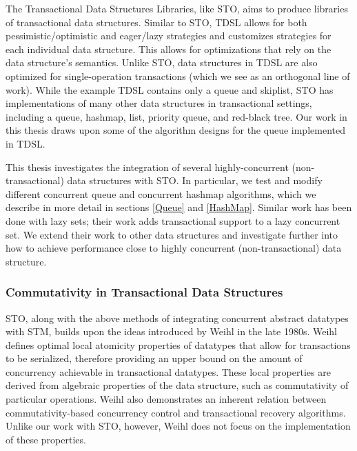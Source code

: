 The Transactional Data Structures Libraries\cite{tdsl}, like STO, aims to produce libraries of transactional data structures. Similar to STO, TDSL allows for both pessimistic/optimistic and eager/lazy strategies and customizes strategies for each individual data structure. This allows for optimizations that rely on the data structure's semantics. Unlike STO, data structures in TDSL are also optimized for single-operation transactions (which we see as an orthogonal line of work). While the example TDSL contains only a queue and skiplist, STO has implementations of many other data structures in transactional settings, including a queue, hashmap, list, priority queue, and red-black tree. Our work in this thesis draws upon some of the algorithm designs for the queue implemented in TDSL.

This thesis investigates the integration of several highly-concurrent (non-transactional) data structures with STO. In particular, we test and modify different concurrent queue \cite{queue1}\cite{queue2}\cite{queue3}\cite{queue4}\cite{queue5}\cite{flatcombining} and concurrent hashmap\cite{hm1}\cite{hm2}\cite{hm3}\cite{chm} algorithms, which we describe in more detail in sections \ref{Queue} and \ref{HashMap}. Similar work has been done with lazy sets\cite{lazyset}; their work adds transactional support to a lazy concurrent set. We extend their work to other data structures and investigate further into how to achieve performance close to highly concurrent (non-transactional) data structure.

\subsubsection{Commutativity in Transactional Data Structures}

STO, along with the above methods of integrating concurrent abstract datatypes with STM, builds upon the ideas introduced by Weihl in the late 1980s\cite{weihl}. Weihl defines optimal local atomicity properties of datatypes that allow for transactions to be serialized, therefore providing an upper bound on the amount of concurrency achievable in transactional datatypes. These local properties are derived from algebraic properties of the data structure, such as commutativity of particular operations. Weihl also demonstrates an inherent relation between commutativity-based concurrency control and transactional recovery algorithms. Unlike our work with STO, however, Weihl does not focus on the implementation of these properties.


